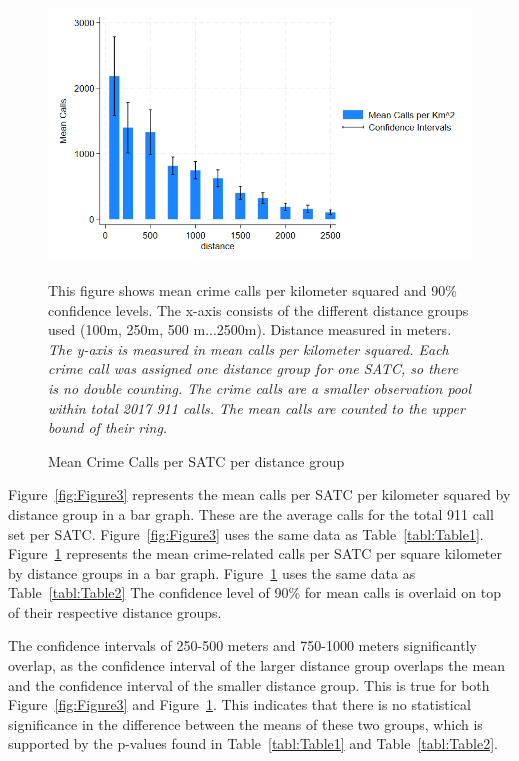 \documentclass[12pt]{article}
\begin{document}
\begin{figure}[htbp]
    \centering
\includegraphics[width=0.75\linewidth]{Reproducibility Package/Visual Graphics/Crime_CI_Graph.png}
    \caption{Mean Crime Calls per SATC per distance group}
    \label{fig:Figure4}
       {This figure shows mean crime calls per kilometer squared and 90\% confidence levels. The x-axis consists of the different distance groups used (100m, 250m, 500 m...2500m). Distance measured in meters.}
    \textit{The y-axis is measured in mean calls per kilometer squared. Each crime call was assigned one distance group for one SATC, so there is no double counting. The crime calls are a smaller observation pool within total 2017 911 calls. The mean calls are counted to the upper bound of their ring.}
\end{figure}

Figure~\ref{fig:Figure3} represents the mean calls per SATC per kilometer squared by distance group in a bar graph. These are the average calls for the total 911 call set per SATC. Figure~\ref{fig:Figure3} uses the same data as Table~\ref{tabl:Table1}. Figure~\ref{fig:Figure4} represents the mean crime-related calls per SATC per square kilometer by distance groups in a bar graph. Figure~\ref{fig:Figure4} uses the same data as Table~\ref{tabl:Table2} The confidence level of 90\% for mean calls is overlaid on top of their respective distance groups. 

The confidence intervals of 250-500 meters and 750-1000 meters significantly overlap, as the confidence interval of the larger distance group overlaps the mean and the confidence interval of the smaller distance group. This is true for both Figure~\ref{fig:Figure3} and Figure~\ref{fig:Figure4}. This indicates that there is no statistical significance in the difference between the means of these two groups, which is supported by the p-values found in Table~\ref{tabl:Table1} and Table~\ref{tabl:Table2}. 
\end{document}
